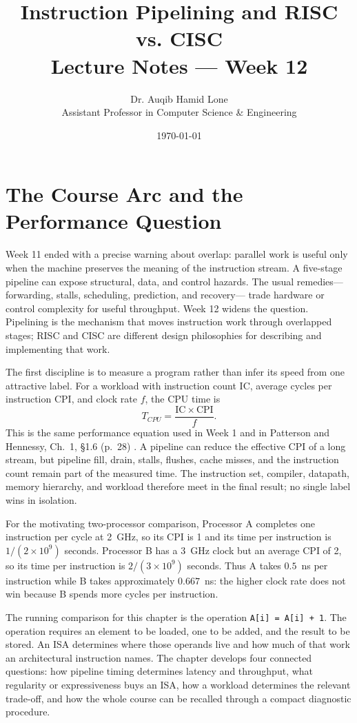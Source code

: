 \documentclass[11pt]{article}
\title{Instruction Pipelining and RISC vs. CISC\\\large Lecture Notes --- Week 12}
\author{Dr. Auqib Hamid Lone\\\small Assistant Professor in Computer Science \& Engineering}
\date{\today}
\begin{document}
\maketitle

\section{The Course Arc and the Performance Question}
\label{sec:arc}

Week 11 ended with a precise warning about overlap: parallel work is useful
only when the machine preserves the meaning of the instruction stream. A
five-stage pipeline can expose structural, data, and control hazards. The
usual remedies---forwarding, stalls, scheduling, prediction, and recovery---
trade hardware or control complexity for useful throughput. Week 12 widens the
question. Pipelining is the mechanism that moves instruction work through
overlapped stages; RISC and CISC are different design philosophies for
describing and implementing that work.

The first discipline is to measure a program rather than infer its speed from
one attractive label. For a workload with instruction count $\mathrm{IC}$,
average cycles per instruction $\mathrm{CPI}$, and clock rate $f$, the CPU time
is
\[
  T_{CPU}=\frac{\mathrm{IC}\times\mathrm{CPI}}{f}.
\]
This is the same performance equation used in Week 1 and in Patterson and
Hennessy, Ch.~1, §1.6 (p.~28)
\cite{PattersonHennessy2017_computer_organization_design}. A pipeline can
reduce the effective CPI of a long stream, but pipeline fill, drain, stalls,
flushes, cache misses, and the instruction count remain part of the measured
time. The instruction set, compiler, datapath, memory hierarchy, and workload
therefore meet in the final result; no single label wins in isolation.

For the motivating two-processor comparison, Processor A completes one
instruction per cycle at 2~GHz, so its CPI is 1 and its time per instruction is
$1/(2\times10^9)$ seconds. Processor B has a 3~GHz clock but an average CPI of
2, so its time per instruction is $2/(3\times10^9)$ seconds. Thus A takes
$0.5$~ns per instruction while B takes approximately $0.667$~ns: the higher
clock rate does not win because B spends more cycles per instruction.

The running comparison for this chapter is the operation
\texttt{A[i] = A[i] + 1}. The operation requires an element to be loaded, one
to be added, and the result to be stored. An ISA determines where those
operands live and how much of that work an architectural instruction names.
The chapter develops four connected questions: how pipeline timing determines
latency and throughput, what regularity or expressiveness buys an ISA, how a
workload determines the relevant trade-off, and how the whole course can be
recalled through a compact diagnostic procedure.
\end{document}
